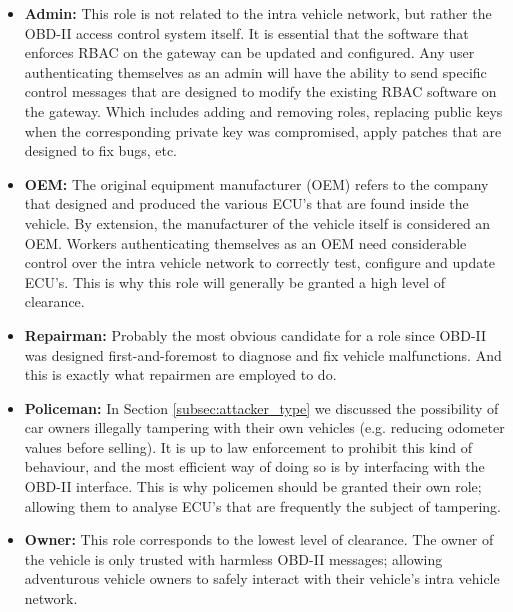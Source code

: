 \begin{itemize}
	\item \textbf{Admin:} This role is not related to the intra vehicle network, but rather the OBD-II access control system itself. It is essential that the software that enforces RBAC on the gateway can be updated and configured. Any user authenticating themselves as an admin will have the ability to send specific control messages that are designed to modify the existing RBAC software on the gateway. Which includes adding and removing roles, replacing public keys when the corresponding private key was compromised, apply patches that are designed to fix bugs, etc.
	
	\item \textbf{OEM:} The original equipment manufacturer (OEM) refers to the company that designed and produced the various ECU's that are found inside the vehicle. By extension, the manufacturer of the vehicle itself is considered an OEM. Workers authenticating themselves as an OEM need considerable control over the intra vehicle network to correctly test, configure and update ECU's. This is why this role will generally be granted a high level of clearance.
	
	\item \textbf{Repairman:} Probably the most obvious candidate for a role since OBD-II was designed first-and-foremost to diagnose and fix vehicle malfunctions. And this is exactly what repairmen are employed to do.
	
	\item \textbf{Policeman:} In Section \ref{subsec:attacker_type} we discussed the possibility of car owners illegally tampering with their own vehicles (e.g. reducing odometer values before selling). It is up to law enforcement to prohibit this kind of behaviour, and the most efficient way of doing so is by interfacing with the OBD-II interface. This is why policemen should be granted their own role; allowing them to analyse ECU's that are frequently the subject of tampering.
	
	\item \textbf{Owner:} This role corresponds to the lowest level of clearance. The owner of the vehicle is only trusted with harmless OBD-II messages; allowing adventurous vehicle owners to safely interact with their vehicle's intra vehicle network.
\end{itemize}
